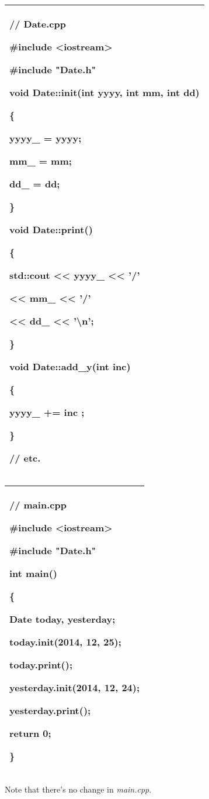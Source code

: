 \documentclass[
]{article}
\begin{document}
\begin{longtable}[]{@{}l@{}}
\toprule
\endhead
\begin{minipage}[t]{0.97\columnwidth}\raggedright
// Date.cpp

\#include \textless iostream\textgreater{}

\#include "Date.h"

void Date::init(int yyyy, int mm, int dd)

\{

yyyy\_ = yyyy;

mm\_ = mm;

dd\_ = dd;

\}

void Date::print()

\{

std::cout \textless\textless{} yyyy\_ \textless\textless{} '/'

\textless\textless{} mm\_ \textless\textless{} '/'

\textless\textless{} dd\_ \textless\textless{} '\textbackslash n';

\}

void Date::add\_y(int inc)

\{

yyyy\_ += inc ;

\}

// etc.\strut
\end{minipage}\tabularnewline
\bottomrule
\end{longtable}

\begin{longtable}[]{@{}l@{}}
\toprule
\endhead
\begin{minipage}[t]{0.97\columnwidth}\raggedright
// main.cpp

\#include \textless iostream\textgreater{}

\#include "Date.h"

int main()

\{

Date today, yesterday;

today.init(2014, 12, 25);

today.print();

yesterday.init(2014, 12, 24);

yesterday.print();

return 0;

\}\strut
\end{minipage}\tabularnewline
\bottomrule
\end{longtable}

Note that there's no change in \emph{main.cpp}.
\end{document}

